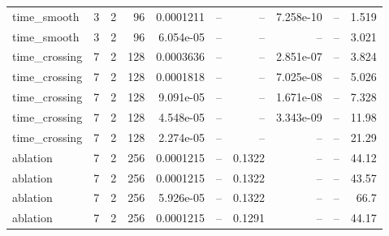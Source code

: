 \begin{tabular}{lrrrrrrrrr}
time\_smooth & 3 & 2 & 96 & 0.0001211 & -- & -- & 7.258e-10 & -- & 1.519 \\
time\_smooth & 3 & 2 & 96 & 6.054e-05 & -- & -- & -- & -- & 3.021 \\
time\_crossing & 7 & 2 & 128 & 0.0003636 & -- & -- & 2.851e-07 & -- & 3.824 \\
time\_crossing & 7 & 2 & 128 & 0.0001818 & -- & -- & 7.025e-08 & -- & 5.026 \\
time\_crossing & 7 & 2 & 128 & 9.091e-05 & -- & -- & 1.671e-08 & -- & 7.328 \\
time\_crossing & 7 & 2 & 128 & 4.548e-05 & -- & -- & 3.343e-09 & -- & 11.98 \\
time\_crossing & 7 & 2 & 128 & 2.274e-05 & -- & -- & -- & -- & 21.29 \\
ablation & 7 & 2 & 256 & 0.0001215 & -- & 0.1322 & -- & -- & 44.12 \\
ablation & 7 & 2 & 256 & 0.0001215 & -- & 0.1322 & -- & -- & 43.57 \\
ablation & 7 & 2 & 256 & 5.926e-05 & -- & 0.1322 & -- & -- & 66.7 \\
ablation & 7 & 2 & 256 & 0.0001215 & -- & 0.1291 & -- & -- & 44.17 \\
\hline
\end{tabular}
